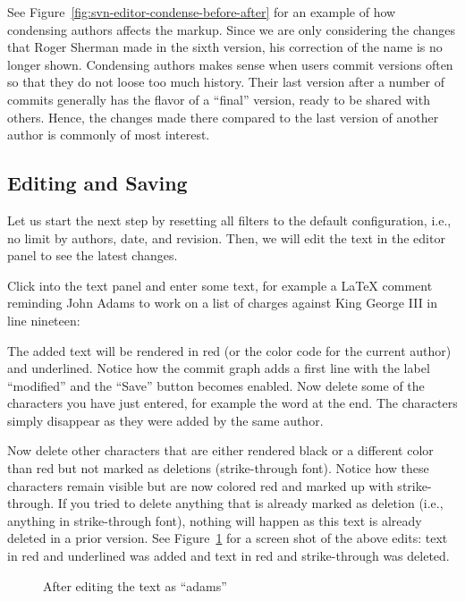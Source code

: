 See Figure~\ref{fig:svn-editor-condense-before-after} for an example of how condensing authors affects the markup.  Since we are only considering the changes that Roger Sherman made in the sixth version, his correction of the name is no longer shown.  Condensing authors makes sense when users commit versions often so that they do not loose too much history.  Their last version after a number of commits generally has the flavor of a ``final'' version, ready to be shared with others.  Hence, the changes made there compared to the last version of another author is commonly of most interest.

\subsection{Editing and Saving} %

Let us start the next step by resetting all filters to the default configuration, i.e., no limit by authors, date, and revision.  Then, we will edit the text in the editor panel to see the latest changes.

Click into the text panel and enter some text, for example a LaTeX comment reminding John Adams to work on a list of charges against King George III in line nineteen:
\begin{FileVerbatim}
\end{FileVerbatim}
The added text will be rendered in red (or the color code for the current author) and underlined.  Notice how the commit graph adds a first line with the label ``modified'' and the ``Save'' button becomes enabled.  Now delete some of the characters you have just entered, for example the word  at the end.  The characters simply disappear as they were added by the same author.

Now delete other characters that are either rendered black or a different color than red but not marked as deletions (strike-through font).  Notice how these characters remain visible but are now colored red and marked up with strike-through.  If you tried to delete anything that is already marked as deletion (i.e., anything in strike-through font), nothing will happen as this text is already deleted in a prior version.  See Figure~\ref{fig:svn-editor-modified} for a screen shot of the above edits: text in red and underlined was added and text in red and strike-through was deleted.

\begin{figure}[t]
\centering
{}
\caption{After editing the text as ``adams''} \label{fig:svn-editor-modified}
\end{figure}

